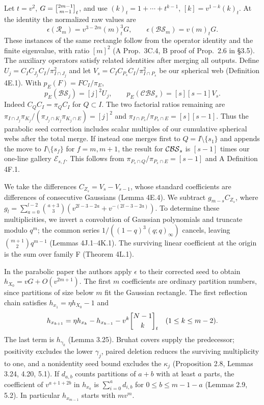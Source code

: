 Let \(t=v^2\), \(G=\gb{2m-1}{m-1}_t\), and use \((k)_t=1+\cdots+t^{k-1}\), \([k]=v^{1-k}(k)_t\). At the identity the normalized raw values are
\[
 \epsilon(\mathcal R_m)=v^{3-2m}(m)_t^3G,\qquad
 \epsilon(\mathcal{BS}_m)=v(m)_tG .
\]
These instances of the same rectangle follow from the operator identity and the finite eigenvalue, with ratio \([m]^2\) (A Prop.\ 3C.4, B proof of Prop.\ 2.6 in \S3.5). The auxiliary operators satisfy related identities after merging all outputs. Define \(U_j=C_I C_{J_j}C_I/\pi_{I\cap J_j}^2\) and let \(V_s=C_I C_{P_s}C_I/\pi_{I\cap P_s}^2\) be our spherical web (Definition 4E.1). With \(p_E(F)=FC_I/\pi_E\),
\[
 p_E(\mathcal{BS}_j)=[j]^2U_j,\qquad p_E(\mathcal{CBS}_s)=[s][s-1]V_s .
\]
Indeed \(C_Q C_I=\pi_Q C_I\) for \(Q\subset I\). The two factorial ratios remaining are \(\pi_{I\cap J_j}\pi_{K_j}/(\pi_{J_j\cap K_j}\pi_{K_j\cap E})=[j]^2\) and \(\pi_{I\cap P_s}/\pi_{P_s\cap E}=[s][s-1]\). Thus the parabolic seed correction includes scalar multiples of our cumulative spherical webs after the total merge. If instead one merges first to $Q=I\setminus\{s_1\}$ and appends the move to $I\setminus\{s_f\}$ for $f=m,m+1$, the result for $\mathcal{CBS}_s$ is $[s-1]$ times our one-line gallery $\mathcal E_{s,f}$. This follows from $\pi_{P_s\cap Q}/\pi_{P_s\cap E}=[s-1]$ and A Definition 4F.1.

We take the differences \(C_{Z_s}=V_s-V_{s-1}\), whose standard coefficients are differences of consecutive Gaussians (Lemma 4E.4). We subtract \(g_{m-s}C_{Z_s}\), where \(g_l=\sum_{a=0}^{l-2}\binom{a+3}{3}(v^{2l-3-2a}+v^{-(2l-3-2a)})\). To determine these multiplicities, we invert a convolution of Gaussian polynomials and truncate modulo \(q^m\); the common series \(1/((1-q)^3(q;q)_\infty)\) cancels, leaving \(\binom{m+1}{2}q^{m-1}\) (Lemmas 4J.1--4K.1). The surviving linear coefficient at the origin is the sum over family F (Theorem 4L.1).

In the parabolic paper the authors apply \(\epsilon\) to their corrected seed to obtain \(h_{X_0}=vG+O(v^{2m+1})\). The first \(m\) coefficients are ordinary partition numbers, since partitions of size below \(m\) fit the Gaussian rectangle. The first reflection chain satisfies \(h_{x_1}=\eta h_{X_0}-1\) and
\[
 h_{x_{k+1}}=\eta h_{x_k}-h_{x_{k-1}}-v^k\gb{N-1}{k}_t
 \quad(1\le k\le m-2).
\]
The last term is \(h_{\gamma_k}\) (Lemma 3.25). Bruhat covers supply the predecessor; positivity excludes the lower \(\gamma_j\), paired deletion reduces the surviving multiplicity to one, and a nonidentity seed bound excludes the \(\kappa_j\) (Proposition 2.8, Lemmas 3.24, 4.20, 5.1). If \(d_{a,b}\) counts partitions of \(a+b\) with at least \(a\) parts, the coefficient of \(v^{a+1+2b}\) in \(h_{x_a}\) is \(\sum_{i=0}^a d_{i,b}\) for \(0\le b\le m-1-a\) (Lemmas 2.9, 5.2). In particular \(h_{x_{m-1}}\) starts with \(mv^m\).

